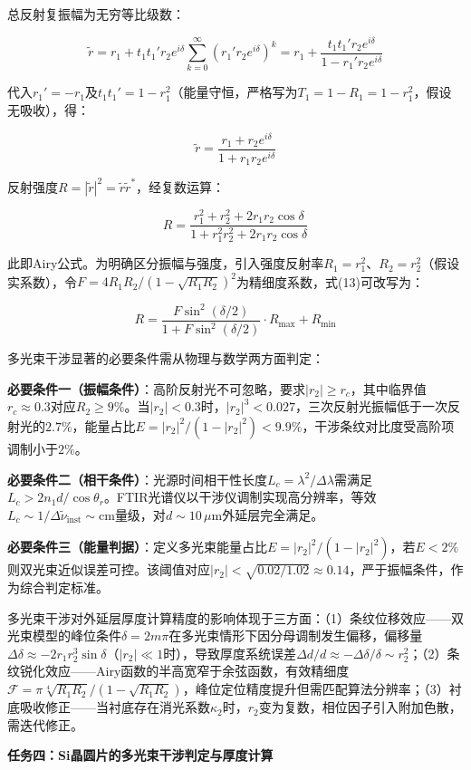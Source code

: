 \documentclass{mcmthesis}
\begin{document}
总反射复振幅为无穷等比级数：

$$\tilde{r} = r_1 + t_1 t_1' r_2 e^{i\delta}\sum_{k=0}^{\infty}(r_1'r_2 e^{i\delta})^k = r_1 + \frac{t_1 t_1' r_2 e^{i\delta}}{1-r_1'r_2 e^{i\delta}} \tag{11}$$

代入$r_1'=-r_1$及$t_1t_1'=1-r_1^2$（能量守恒，严格写为$T_1=1-R_1=1-r_1^2$，假设无吸收），得：

$$\tilde{r} = \frac{r_1 + r_2 e^{i\delta}}{1 + r_1 r_2 e^{i\delta}} \tag{12}$$

反射强度$R=|\tilde{r}|^2=\tilde{r}\tilde{r}^*$，经复数运算：

$$R = \frac{r_1^2 + r_2^2 + 2r_1r_2\cos\delta}{1 + r_1^2r_2^2 + 2r_1r_2\cos\delta} \tag{13}$$

此即Airy公式。为明确区分振幅与强度，引入强度反射率$R_1=r_1^2$、$R_2=r_2^2$（假设实系数），令$F=4R_1R_2/(1-\sqrt{R_1R_2})^2$为精细度系数，式(13)可改写为：

$$R = \frac{F\sin^2(\delta/2)}{1+F\sin^2(\delta/2)}\cdot R_{\max} + R_{\min} \tag{14}$$

多光束干涉显著的必要条件需从物理与数学两方面判定：

\textbf{必要条件一（振幅条件）}：高阶反射光不可忽略，要求$|r_2|\geq r_c$，其中临界值$r_c\approx 0.3$对应$R_2\geq 9\%$。当$|r_2|<0.3$时，$|r_2|^3<0.027$，三次反射光振幅低于一次反射光的$2.7\%$，能量占比$E=|r_2|^2/(1-|r_2|^2)<9.9\%$，干涉条纹对比度受高阶项调制小于$2\%$。

\textbf{必要条件二（相干条件）}：光源时间相干性长度$L_c=\lambda^2/\Delta\lambda$需满足$L_c>2n_1d/\cos\theta_r$。FTIR光谱仪以干涉仪调制实现高分辨率，等效$L_c\sim 1/\Delta\tilde{\nu}_{\mathrm{inst}}\sim \mathrm{cm}$量级，对$d\sim 10\,\mu\mathrm{m}$外延层完全满足。

\textbf{必要条件三（能量判据）}：定义多光束能量占比$E=|r_2|^2/(1-|r_2|^2)$，若$E<2\%$则双光束近似误差可控。该阈值对应$|r_2|<\sqrt{0.02/1.02}\approx 0.14$，严于振幅条件，作为综合判定标准。

多光束干涉对外延层厚度计算精度的影响体现于三方面：（1）条纹位移效应——双光束模型的峰位条件$\delta=2m\pi$在多光束情形下因分母调制发生偏移，偏移量$\Delta\delta\approx -2r_1r_2^3\sin\delta$（$|r_2|\ll 1$时），导致厚度系统误差$\Delta d/d\approx -\Delta\delta/\delta\sim r_2^2$；（2）条纹锐化效应——Airy函数的半高宽窄于余弦函数，有效精细度$\mathcal{F}=\pi\sqrt[4]{R_1R_2}/(1-\sqrt{R_1R_2})$，峰位定位精度提升但需匹配算法分辨率；（3）衬底吸收修正——当衬底存在消光系数$\kappa_2$时，$r_2$变为复数，相位因子引入附加色散，需迭代修正。

\textbf{任务四：Si晶圆片的多光束干涉判定与厚度计算}
\end{document}
